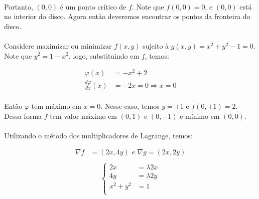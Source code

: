 \documentclass{article}
\begin{document}
            \paragraph{}
            Portanto, $(0, 0)$ é um ponto crítico de $f$. Note que $f(0, 0) = 0$, e
            $(0, 0)$ está no interior do disco. Agora então deveremos encontrar os pontos
            da fronteira do disco.
                
            \paragraph{}
            Considere maximizar ou minimizar $f(x, y)$ sujeito à $g(x, y) = x^2 + y^2 - 1 = 0$.
            Note que $y^2 = 1 - x^2$, logo, substituindo em $f$, temos:
            
            \begin{align*}
                \varphi(x) &= -x^2 + 2\\
                \frac{d\varphi}{dx} (x) &= -2x = 0 \Rightarrow x = 0
            \end{align*}

            \paragraph{}
            Então $\varphi$ tem máximo em $x = 0$. Nesse caso, temos $y = \pm 1$ e $f(0, \pm 1) = 2$.
            Dessa forma $f$ tem valor máximo em $(0, 1)$ e $(0, -1)$ e mínimo em $(0, 0)$.

            \paragraph{}
            Utilizando o método dos multiplicadores de Lagrange, temos:
            
            \begin{align*}
                \nabla f &= (2x, 4y) \textit{ e } \nabla g = (2x, 2y)\\
            \end{align*}
            \begin{align*}
                \begin{cases}
                    2x &= \lambda 2x\\
                    4y &= \lambda 2y\\
                    x^2 + y^2 &= 1\\
                \end{cases}
            \end{align*}
\end{document}
